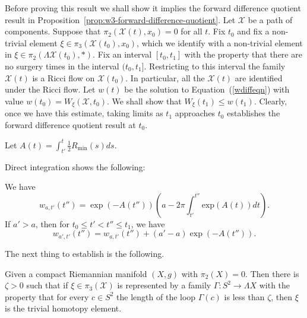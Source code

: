 Before proving this result we shall show it implies the forward difference
quotient result in Proposition~\ref{prop:w3-forward-difference-quotient}. Let ${\mathcal X}$ be a path
of components. Suppose that $\pi_2({\mathcal X}(t),x_0)=0$ for all $t$. Fix
$t_0$ and fix a non-trivial element $\xi\in \pi_3({\mathcal X}(t_0),x_0)$,
which we identify with a non-trivial element in $\xi\in \pi_2(\Lambda{\mathcal
X}(t_0),*)$. Fix an interval $[t_0,t_1]$ with the property that there are no
surgery times in the interval $(t_0,t_1]$. Restricting to this interval the
family ${\mathcal X}(t)$ is a Ricci flow on ${\mathcal X}(t_0)$. In particular,
all the ${\mathcal X}(t)$ are identified under the Ricci flow.
 Let
$w(t)$ be the solution to Equation~(\ref{wdiffeqn}) with value
$w(t_0)=W_\xi({\mathcal X},t_0)$. We shall show that $W_\xi(t_1)\le
w(t_1)$. Clearly, once we have this estimate, taking limits as $t_1$
approaches $t_0$ establishes the forward difference quotient result
at $t_0$.

\begin{definition}
\label{def:a-function-integral}
Let $A(t)=\int_{t'}^t\frac{1}{2}R_{\min}(s)ds$.
\end{definition}

Direct integration shows the following:


\begin{claim}
\label{claim:w-a-t-explicit-formula}
\label{vclaim}
We have
$$w_{a,t'}(t'')=\exp(-A(t''))\left(a-2\pi\int_{t'}^{t''}\mathrm{exp}(A(t))dt\right).$$ If $a'>a$, then for $t_0\le t'<t''\le t_1$,
we have
$$w_{a',t'}(t'')=w_{a,t'}(t'')+(a'-a)\exp(-A(t'')).$$
\end{claim}







 The next thing to
establish is the following.

\begin{lemma}
\label{lem:short-loops-trivial-pi3}
\label{shortpi2triv}
Given a compact Riemannian manifold $(X,g)$ with $\pi_2(X)=0$. Then
there is $\zeta>0$ such that if $\xi\in \pi_3({\mathcal X})$ is
represented by a family $\Gamma\colon S^2\to\Lambda X$ with the
property that for every $c\in S^2$ the length of the loop
$\Gamma(c)$ is less than $\zeta$, then $\xi$ is the trivial homotopy
element.
\end{lemma}


